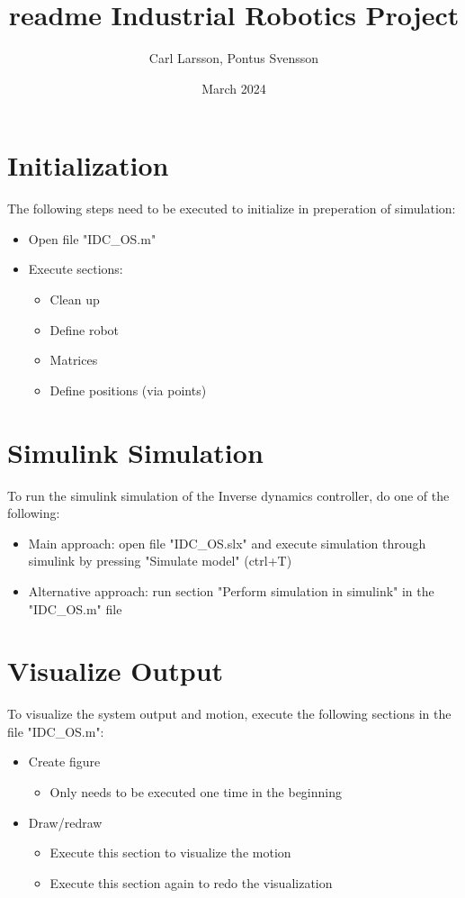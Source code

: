 \documentclass{article}
\title{readme Industrial Robotics Project}
\author{Carl Larsson, Pontus Svensson}
\date{March 2024}
\begin{document}
\maketitle

\section{Initialization}
The following steps need to be executed to initialize in preperation of simulation:
\begin{itemize}
    \item Open file "IDC\_OS.m"
    \item Execute sections:
    \begin{itemize}
        \item Clean up
        \item Define robot
        \item Matrices
        \item Define positions (via points)
    \end{itemize}
\end{itemize}

\section{Simulink Simulation}
To run the simulink simulation of the Inverse dynamics controller, do one of the following:
\begin{itemize}
    \item Main approach: open file "IDC\_OS.slx" and execute simulation through simulink by pressing "Simulate model" (ctrl+T)
    \item Alternative approach: run section "Perform simulation in simulink" in the "IDC\_OS.m" file
\end{itemize}

\section{Visualize Output}
To visualize the system output and motion, execute the following sections in the file "IDC\_OS.m":
\begin{itemize}
    \item Create figure 
    \begin{itemize}
        \item Only needs to be executed one time in the beginning
    \end{itemize}
    \item Draw/redraw
    \begin{itemize}
        \item Execute this section to visualize the motion
        \item Execute this section again to redo the visualization
    \end{itemize}
\end{itemize}
\end{document}
